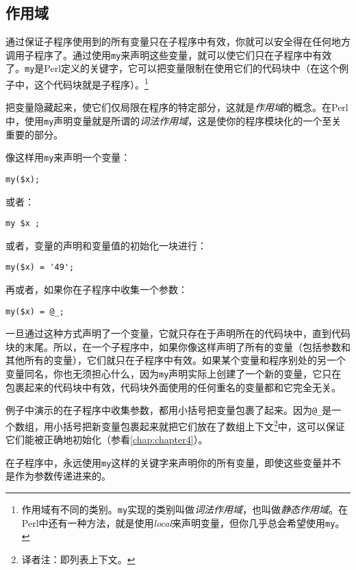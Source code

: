 \subsection{作用域}
通过保证子程序使用到的所有变量只在子程序中有效，你就可以安全得在任何地方调用子程序了。通过使用\verb|my|来声明这些变量，就可以使它们只在子程序中有效了。\verb|my|是Perl定义的关键字，它可以把变量限制在使用它们的代码块中（在这个例子中，这个代码块就是子程序）。\footnote{作用域有不同的类别。\verb|my|实现的类别叫做\textit{词法作用域}，也叫做\textit{静态作用域}。在Perl中还有一种方法，就是使用\textit{local}来声明变量，但你几乎总会希望使用\verb|my|。} 

把变量隐藏起来，使它们仅局限在程序的特定部分，这就是\textit{作用域}的概念。在Perl中，使用\verb|my|声明变量就是所谓的\textit{词法作用域}，这是使你的程序模块化的一个至关重要的部分。

像这样用\verb|my|来声明一个变量：

\begin{lstlisting}
my($x); 
\end{lstlisting}

或者：

\begin{lstlisting}
my $x ; 
\end{lstlisting}

或者，变量的声明和变量值的初始化一块进行：

\begin{lstlisting}
my($x) = '49'; 
\end{lstlisting}

再或者，如果你在子程序中收集一个参数：

\begin{lstlisting}
my($x) = @_; 
\end{lstlisting}

一旦通过这种方式声明了一个变量，它就只存在于声明所在的代码块中，直到代码块的末尾。所以，在一个子程序中，如果你像这样声明了所有的变量（包括参数和其他所有的变量），它们就只在子程序中有效。如果某个变量和程序别处的另一个变量同名，你也无须担心什么，因为\verb|my|声明实际上创建了一个新的变量，它只在包裹起来的代码块中有效，代码块外面使用的任何重名的变量都和它完全无关。

例子中演示的在子程序中收集参数，都用小括号把变量包裹了起来。因为\verb|@_|是一个数组，用小括号把新变量包裹起来就把它们放在了数组上下文\footnote{译者注：即列表上下文。}中，这可以保证它们能被正确地初始化（参看\autoref{chap:chapter4}）。

\begin{adjustwidth}{2cm}{2cm}
  \noindent
  在子程序中，永远使用\verb|my|这样的关键字来声明你的所有变量，即使这些变量并不是作为参数传递进来的。
\end{adjustwidth}

